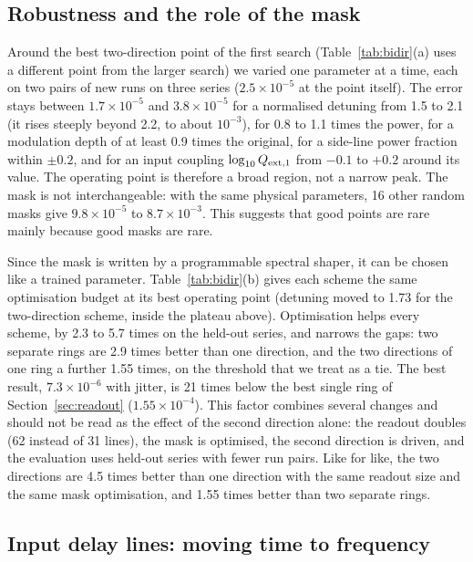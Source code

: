 \subsection{Robustness and the role of the mask}

Around the best two-direction point of the first search (Table~\ref{tab:bidir}(a) uses a different point from the larger search) we
varied one parameter at a time, each on two pairs of new runs on three series ($2.5\times10^{-5}$ at the point itself). The error stays
between $1.7\times10^{-5}$ and $3.8\times10^{-5}$ for a normalised detuning from 1.5 to 2.1 (it rises steeply beyond 2.2, to about $10^{-3}$), for 0.8 to 1.1 times the power, for a
modulation depth of at least 0.9 times the original, for a side-line power fraction within $\pm0.2$, and for an input coupling
$\log_{10}Q_{\mathrm{ext},1}$ from $-0.1$ to $+0.2$ around its value. The operating point is therefore a broad region, not a narrow
peak. The mask is not interchangeable: with the same physical parameters, 16 other random masks give $9.8\times10^{-5}$ to
$8.7\times10^{-3}$. This suggests that good points are rare mainly because good masks are rare.

Since the mask is written by a programmable spectral shaper, it can be chosen like a trained parameter. Table~\ref{tab:bidir}(b) gives
each scheme the same optimisation budget at its best operating point (detuning moved to 1.73 for the two-direction scheme, inside the
plateau above). Optimisation helps every scheme, by 2.3 to 5.7 times on the held-out series, and narrows the gaps: two separate rings
are 2.9 times better than one direction, and the two directions of one ring a further 1.55 times, on the threshold that we treat as a
tie. The best result, $7.3\times10^{-6}$ with jitter, is 21 times below the best single ring of Section~\ref{sec:readout}
($1.55\times10^{-4}$). This factor combines several changes and should not be read as the effect of the second direction alone: the
readout doubles (62 instead of 31 lines), the mask is optimised, the second direction is driven, and the evaluation uses held-out series
with fewer run pairs. Like for like, the two directions are 4.5 times better than one direction with the same readout size and the
same mask optimisation, and 1.55 times better than two separate rings.

\subsection{Input delay lines: moving time to frequency}

